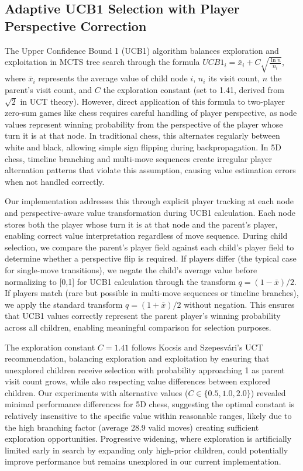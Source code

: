 \documentclass{article}
\begin{document}
\subsection{Adaptive UCB1 Selection with Player Perspective Correction}

The Upper Confidence Bound 1 (UCB1) algorithm balances exploration and exploitation in MCTS tree search through the formula $UCB1_i = \bar{x}_i + C\sqrt{\frac{\ln n}{n_i}}$, where $\bar{x}_i$ represents the average value of child node $i$, $n_i$ its visit count, $n$ the parent's visit count, and $C$ the exploration constant (set to 1.41, derived from $\sqrt{2}$ in UCT theory). However, direct application of this formula to two-player zero-sum games like chess requires careful handling of player perspective, as node values represent winning probability from the perspective of the player whose turn it is at that node. In traditional chess, this alternates regularly between white and black, allowing simple sign flipping during backpropagation. In 5D chess, timeline branching and multi-move sequences create irregular player alternation patterns that violate this assumption, causing value estimation errors when not handled correctly.

Our implementation addresses this through explicit player tracking at each node and perspective-aware value transformation during UCB1 calculation. Each node stores both the player whose turn it is at that node and the parent's player, enabling correct value interpretation regardless of move sequence. During child selection, we compare the parent's player field against each child's player field to determine whether a perspective flip is required. If players differ (the typical case for single-move transitions), we negate the child's average value before normalizing to [0,1] for UCB1 calculation through the transform $q = (1 - \bar{x})/2$. If players match (rare but possible in multi-move sequences or timeline branches), we apply the standard transform $q = (1 + \bar{x})/2$ without negation. This ensures that UCB1 values correctly represent the parent player's winning probability across all children, enabling meaningful comparison for selection purposes.

The exploration constant $C=1.41$ follows Kocsis and Szepesvári's UCT recommendation, balancing exploration and exploitation by ensuring that unexplored children receive selection with probability approaching 1 as parent visit count grows, while also respecting value differences between explored children. Our experiments with alternative values ($C \in \{0.5, 1.0, 2.0\}$) revealed minimal performance differences for 5D chess, suggesting the optimal constant is relatively insensitive to the specific value within reasonable ranges, likely due to the high branching factor (average 28.9 valid moves) creating sufficient exploration opportunities. Progressive widening, where exploration is artificially limited early in search by expanding only high-prior children, could potentially improve performance but remains unexplored in our current implementation.
\end{document}

